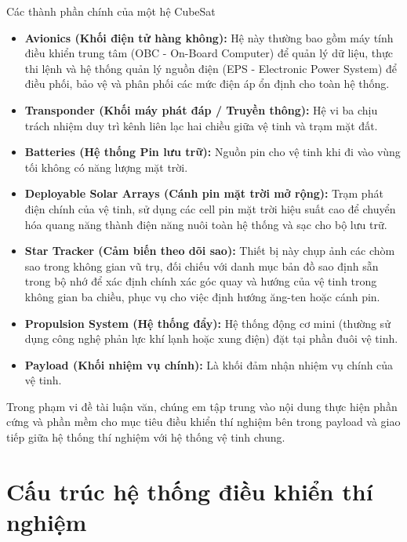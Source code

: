 Các thành phần chính của một hệ CubeSat

\begin{itemize}
    
    \item \textbf{Avionics (Khối điện tử hàng không):} Hệ này thường bao gồm máy tính điều khiển trung tâm (OBC - On-Board Computer) để quản lý dữ liệu, thực thi lệnh và hệ thống quản lý nguồn điện (EPS - Electronic Power System) để điều phối, bảo vệ và phân phối các mức điện áp ổn định cho toàn hệ thống.
    
    \item \textbf{Transponder (Khối máy phát đáp / Truyền thông):} Hệ vi ba chịu trách nhiệm duy trì kênh liên lạc hai chiều giữa vệ tinh và trạm mặt đất.
    
    \item \textbf{Batteries (Hệ thống Pin lưu trữ):} Nguồn pin cho vệ tinh khi đi vào vùng tối không có năng lượng mặt trời. 
    
    \item \textbf{Deployable Solar Arrays (Cánh pin mặt trời mở rộng):} Trạm phát điện chính của vệ tinh, sử dụng các cell pin mặt trời hiệu suất cao để chuyển hóa quang năng thành điện năng nuôi toàn hệ thống và sạc cho bộ lưu trữ.
    
    \item \textbf{Star Tracker (Cảm biến theo dõi sao):} Thiết bị này chụp ảnh các chòm sao trong không gian vũ trụ, đối chiếu với danh mục bản đồ sao định sẵn trong bộ nhớ để xác định chính xác góc quay và hướng của vệ tinh trong không gian ba chiều, phục vụ cho việc định hướng ăng-ten hoặc cánh pin.
    
    \item \textbf{Propulsion System (Hệ thống đẩy):} Hệ thống động cơ mini (thường sử dụng công nghệ phản lực khí lạnh hoặc xung điện) đặt tại phần đuôi vệ tinh. 
    
    \item \textbf{Payload (Khối nhiệm vụ chính):} Là khối đảm nhận nhiệm vụ chính của vệ tinh. 
\end{itemize}

Trong phạm vi đề tài luận văn, chúng em tập trung vào nội dung thực hiện phần cứng và phần mềm cho mục tiêu điều khiển thí nghiệm bên trong payload và giao tiếp giữa hệ thống thí nghiệm với hệ thống vệ tinh chung. 

\section{Cấu trúc hệ thống điều khiển thí nghiệm}
\label{sec:kien_truc_exp_if_photo_laser}

